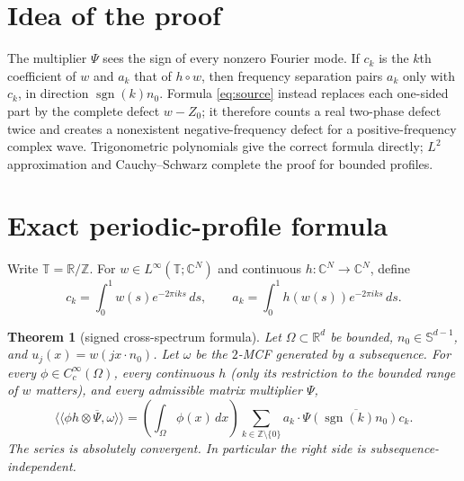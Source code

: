 \documentclass[11pt]{article}
\newtheorem{theorem}{Theorem}
\newcommand{\T}{\mathbb T}
\newcommand{\C}{\mathbb C}
\newcommand{\Sph}{\mathbb S}
\begin{document}
\section{Idea of the proof}

The multiplier $\Psi$ sees the sign of every nonzero Fourier mode.  If
$c_k$ is the $k$th coefficient of $w$ and $a_k$ that of $h\circ w$, then
frequency separation pairs $a_k$ only with $c_k$, in direction
$\operatorname{sgn}(k)n_0$.  Formula \eqref{eq:source} instead replaces each
one-sided part by the complete defect $w-Z_0$; it therefore counts a real
two-phase defect twice and creates a nonexistent negative-frequency defect
for a positive-frequency complex wave.  Trigonometric polynomials give the
correct formula directly; $L^2$ approximation and Cauchy--Schwarz complete
the proof for bounded profiles.

\section{Exact periodic-profile formula}

Write $\T=\mathbb R/\mathbb Z$.  For $w\in L^\infty(\T;\C^N)$ and continuous
$h:\C^N\to\C^N$, define
\[
 c_k=\int_0^1w(s)e^{-2\pi i k s}\,ds,\qquad
 a_k=\int_0^1h(w(s))e^{-2\pi i k s}\,ds.
\]

\begin{theorem}[signed cross-spectrum formula]\label{thm:correct}
Let $\Omega\subset\mathbb R^d$ be bounded, $n_0\in\Sph^{d-1}$, and
$u_j(x)=w(jx\cdot n_0)$.  Let $\omega$ be the $2$-MCF generated by a
subsequence.  For every $\phi\in C_c^\infty(\Omega)$, every continuous $h$
(only its restriction to the bounded range of $w$ matters), and every
admissible matrix multiplier $\Psi$,
\begin{equation}\label{eq:correct}
 \langle\!\langle \phi h\otimes\overline\Psi,\omega\rangle\!\rangle
 =\left(\int_\Omega\phi(x)\,dx\right)
   \sum_{k\in\mathbb Z\setminus\{0\}}
   a_k\cdot\overline{\Psi(\operatorname{sgn}(k)n_0)c_k}.
\end{equation}
The series is absolutely convergent.  In particular the right side is
subsequence-independent.
\end{theorem}
\end{document}

